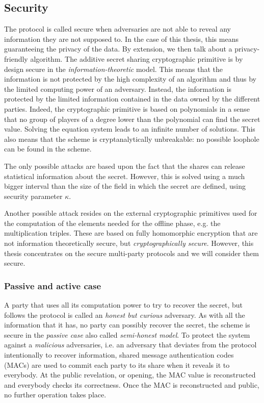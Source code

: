 \subsection{Security}
The protocol is called secure when adversaries are not able to reveal any information they are not supposed to. In the case of this thesis, this means guaranteeing the privacy of the data. By extension, we then talk about a privacy-friendly algorithm. The additive secret sharing cryptographic primitive is by design secure in the \emph{information-theoretic} model. This means that the information is not protected by the high complexity of an algorithm and thus by the limited computing power of an adversary. Instead, the information is protected by the limited information contained in the data owned by the different parties. Indeed, the cryptographic primitive is based on polynomials in a sense that no group of players of a degree lower than the polynomial can find the secret value. Solving the equation system leads to an infinite number of solutions. This also means that the scheme is cryptanalytically unbreakable: no possible loophole can be found in the scheme.

The only possible attacks are based upon the fact that the shares can release statistical information about the secret. However, this is solved using a much bigger interval than the size of the field in which the secret are defined, using security parameter $\kappa$.

Another possible attack resides on the external cryptographic primitives used for the computation of the elements needed for the offline phase, e.g. the multiplication triples. These are based on fully homomorphic encryption that are not information theoretically secure, but \emph{cryptographically secure}. However, this thesis concentrates on the secure multi-party protocols and we will consider them secure.

\subsubsection{Passive and active case}
A party that uses all its computation power to try to recover the secret, but follows the protocol is called an \emph{honest but curious} adversary. As with all the information that it has, no party can possibly recover the secret, the scheme is secure in the \emph{passive case} also called \emph{semi-honest model}. To protect the system against a \emph{malicious} adversaries, i.e. an adversary that deviates from the protocol intentionally to recover information, shared message authentication codes (MACs) are used to commit each party to its share when it reveals it to everybody. At the public revelation, or opening, the MAC value is reconstructed and everybody checks its correctness. Once the MAC is reconstructed and public, no further operation takes place.

